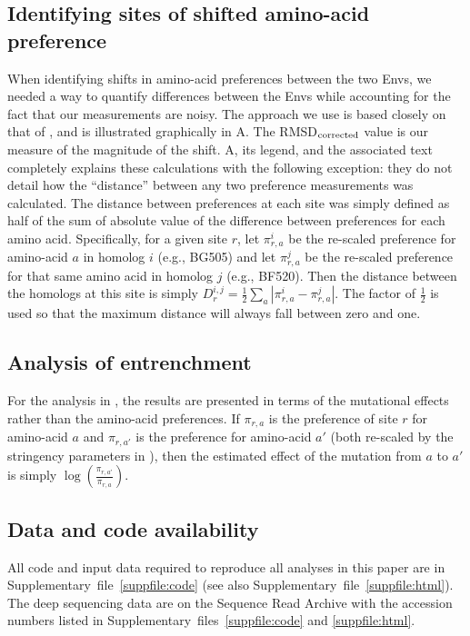 \documentclass[9pt]{elife}
\begin{document}
\subsection{Identifying sites of shifted amino-acid preference}
When identifying shifts in amino-acid preferences between the two Envs, we needed a way to quantify differences between the Envs while accounting for the fact that our measurements are noisy.
The approach we use is based closely on that of \citet{doud2015site}, and is illustrated graphically in A.
The RMSD$_{\rm{corrected}}$ value is our measure of the magnitude of the shift.
A, its legend, and the associated text completely explains these calculations with the following exception: they do not detail how the ``distance'' between any two preference measurements was calculated. 
The distance between preferences at each site was simply defined as half of the sum of absolute value of the difference between preferences for each amino acid.
Specifically, for a given site $r$, let $\pi_{r,a}^{i}$ be the re-scaled preference for amino-acid $a$ in homolog $i$ (e.g., BG505) and let $\pi_{r,a}^{j}$ be the re-scaled preference for that same amino acid in homolog $j$ (e.g., BF520). 
Then the distance between the homologs at this site is simply $D_{r}^{i,j} = \frac{1}{2}\sum_{a}|\pi_{r,a}^{i}-\pi_{r,a}^{j}|$.
The factor of $\frac{1}{2}$ is used so that the maximum distance will always fall between zero and one.

\subsection{Analysis of entrenchment}
For the analysis in , the results are presented in terms of the mutational effects rather than the amino-acid preferences. 
If $\pi_{r,a}$ is the preference of site $r$ for amino-acid $a$ and $\pi_{r,a'}$ is the preference for amino-acid $a'$ (both re-scaled by the stringency parameters in ), then the estimated effect of the mutation from $a$ to $a'$ is simply $\log\left(\frac{\pi_{r,a'}}{\pi_{r,a}}\right)$.

\subsection{Data and code availability}
All code and input data required to reproduce all analyses in this paper are in Supplementary~file~\ref{suppfile:code} (see also Supplementary~file~\ref{suppfile:html}).
The deep sequencing data are on the Sequence Read Archive with the accession numbers listed in Supplementary~files~\ref{suppfile:code} and \ref{suppfile:html}.
\end{document}
